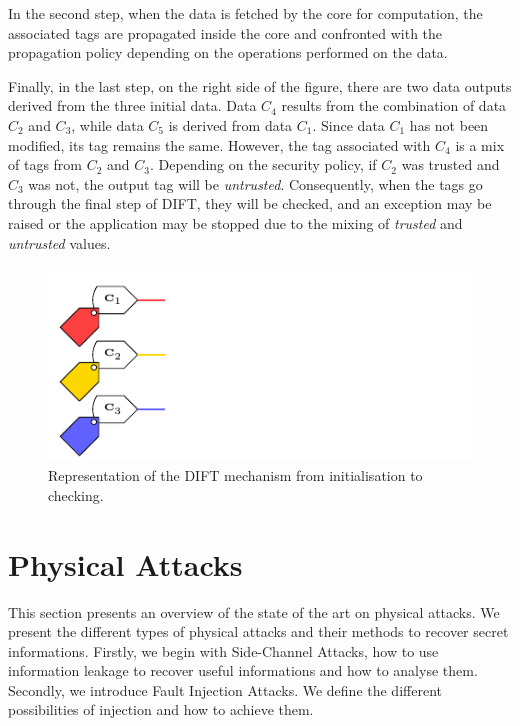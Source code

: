 In the second step, when the data is fetched by the core for computation, the associated tags are propagated inside the core and confronted with the propagation policy depending on the operations performed on the data.

Finally, in the last step, on the right side of the figure, there are two data outputs derived from the three initial data. Data $C_4$ results from the combination of data $C_2$ and $C_3$, while data $C_5$ is derived from data $C_1$. Since data $C_1$ has not been modified, its tag remains the same. However, the tag associated with $C_4$ is a mix of tags from $C_2$ and $C_3$. Depending on the security policy, if $C_2$ was trusted and $C_3$ was not, the output tag will be \textit{untrusted}. Consequently, when the tags go through the final step of DIFT, they will be checked, and an exception may be raised or the application may be stopped due to the mixing of \textit{trusted} and \textit{untrusted} values.

\begin{figure}[ht]
    \centering
    \includegraphics[page=3]{c2_soa/img/schemaDIFT.pdf}
    \caption{Representation of the DIFT mechanism from initialisation to checking.}
    \label{fig:dift_init}
\end{figure}

\section{Physical Attacks}
\label{section:physicalAttacks}

This section presents an overview of the state of the art on physical attacks. We present the different types of physical attacks and their methods to recover secret informations. Firstly, we begin with Side-Channel Attacks, how to use information leakage to recover useful informations and how to analyse them.
Secondly, we introduce Fault Injection Attacks. We define the different possibilities of injection and how to achieve them.

